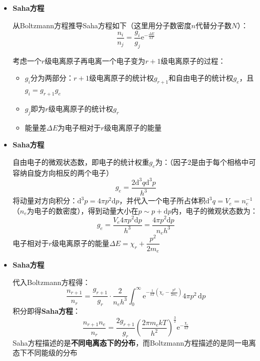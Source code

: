 \documentclass{beamer}
\newenvironment{slide}{
    \begin{frame}{\bfseries{\sectiontitle}}
}{
    \end{frame}
}
\begin{document}
\begin{slide}
    \begin{itemize}
        \item \textbf{Saha方程}

        从Boltzmann方程推导Saha方程如下（这里用分子数密度$n$代替分子数$N$）：
        \[
            \frac{n_i}{n_j} = \frac{g_i}{g_j}\mathrm{e}^{-\tfrac{\Delta E}{kT}}
        \]

        考虑一个$r$级电离原子再电离一个电子变为$r+1$级电离原子的过程：
        \begin{itemize}
            \item $g_i$分为两部分：$r+1$级电离原子的统计权$g_{r+1}$和自由电子的统计权$g_e$，且$g_i=g_{r+1}g_e$

            \item $g_j$即为$r$级电离原子的统计权$g_{r}$

            \item 能量差$\Delta E$为电子相对于$r$级电离原子的能量
        \end{itemize}

    \end{itemize}
\end{slide}

\begin{slide}
    \begin{itemize}
        \item \textbf{Saha方程}

        自由电子的微观状态数，即电子的统计权重$g_e$为：（因子$2$是由于每个相格中可容纳自旋方向相反的两个电子）
        \[
            g_e = \frac{2\mathrm{d}^3q\mathrm{d}^3p}{h^3}
        \]
        将动量对方向积分：$\mathrm{d}^3p=4\pi p^2\mathrm{d}p$，并代入一个电子所占体积$\mathrm{d}^3q=V_e=n_e^{-1}$（$n_e$为电子的数密度），得到动量大小在$p\sim p+\mathrm{d}p$内，电子的微观状态数为：
        \[
            g_e = \frac{V_e4\pi p^2\mathrm{d}p}{h^3} = \frac{4\pi p^2\mathrm{d}p}{n_eh^3}
        \]
        电子相对于$r$级电离原子的能量$\Delta E=\chi_{r}+\dfrac{p^2}{2m_e}$
    \end{itemize}
\end{slide}

\begin{slide}
    \begin{itemize}
        \item \textbf{Saha方程}

        代入Boltzmann方程得：
        \[
            \frac{n_{r+1}}{n_r} = \frac{g_{r+1}}{g_r}\cdot\frac{2}{n_eh^3}\int_0^{\infty}\mathrm{e}^{-\tfrac{1}{kT}\left(\chi_r-\tfrac{p^2}{2m_e}\right)}4\pi p^2\,\mathrm{d}p
        \]
        积分即得\textbf{Saha方程}：
        \[
            \boxed{
            \frac{n_{r+1}n_e}{n_r} = \frac{2g_{r+1}}{g_r}\left(\frac{2\pi m_ekT}{h^2}\right)^{\tfrac{3}{2}}\mathrm{e}^{-\tfrac{\chi_r}{kT}}
            }
        \]
        Saha方程描述的是\textbf{不同电离态下的分布}，而Boltzmann方程描述的是同一电离态下不同能级的分布
    \end{itemize}
\end{slide}
\end{document}
